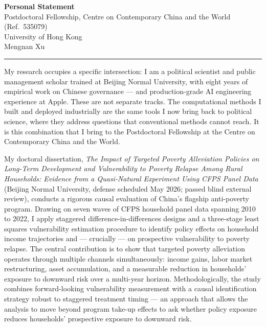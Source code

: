 \documentclass[11pt, letterpaper]{article}
\begin{document}
\begin{center}
  {\large\bfseries Personal Statement}\\[4pt]
  {\normalsize Postdoctoral Fellowship, Centre on Contemporary China and the World (Ref.\ 535079)}\\[2pt]
  {\normalsize University of Hong Kong}\\[4pt]
  {\large Mengnan Xu}
\end{center}

\vspace{6pt}
\noindent\rule{\linewidth}{0.4pt}
\vspace{2pt}

My research occupies a specific intersection: I am a political scientist and public
management scholar trained at Beijing Normal University, with eight years of
empirical work on Chinese governance --- and production-grade AI engineering experience at Apple. These are not separate tracks. The computational
methods I built and deployed industrially are the same tools I now bring back to
political science, where they address questions that conventional methods cannot
reach. It is this combination that I bring to the Postdoctoral Fellowship at the
Centre on Contemporary China and the World.

My doctoral dissertation, \textit{The Impact of Targeted Poverty Alleviation Policies on
Long-Term Development and Vulnerability to Poverty Relapse Among Rural Households:
Evidence from a Quasi-Natural Experiment Using CFPS Panel Data} (Beijing Normal
University, defense scheduled May 2026; passed blind external review), conducts a
rigorous causal evaluation of China's flagship anti-poverty program. Drawing on seven
waves of CFPS household panel data spanning 2010 to 2022, I apply staggered
difference-in-differences designs and a three-stage least squares vulnerability
estimation procedure to identify policy effects on household income trajectories
and --- crucially --- on prospective vulnerability to poverty relapse. The central
contribution is to show that targeted poverty alleviation operates through multiple
channels simultaneously: income gains, labor market restructuring, asset
accumulation, and a measurable reduction in households' exposure to downward risk
over a multi-year horizon. Methodologically, the study combines forward-looking
vulnerability measurement with a causal identification strategy robust to
staggered treatment timing --- an approach that allows the analysis to move beyond
program take-up effects to ask whether policy exposure reduces households'
prospective exposure to downward risk.
\end{document}
